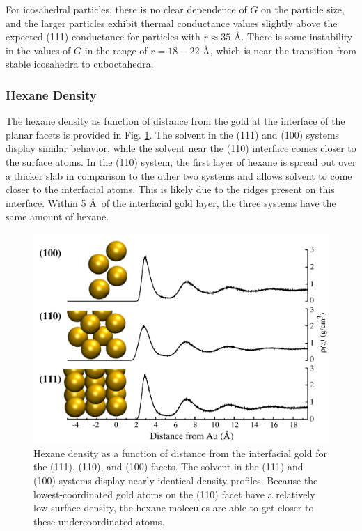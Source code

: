 For icosahedral particles, there is no clear dependence of $G$ on the
particle size, and the larger particles exhibit thermal conductance
values slightly above the expected (111) conductance for particles
with $r \approx 35$ \AA. There is some instability in the values of
$G$ in the range of $r = 18-22$ \AA, which is near the 
transition from stable icosahedra to
cuboctahedra.\cite{Myshlyavtsev2013}

\subsubsection{Hexane Density}
The hexane density as function of distance from the gold at the
interface of the planar facets is provided in Fig. \ref{fig:dens}. The
solvent in the (111) and (100) systems display similar behavior, while
the solvent near the (110) interface comes closer to the surface
atoms.  In the (110) system, the first layer of hexane is spread out
over a thicker slab in comparison to the other two systems and allows
solvent to come closer to the interfacial atoms.  This is likely due
to the ridges present on this interface.  Within 5 \AA\ of the
interfacial gold layer, the three systems have the same amount of
hexane.

\begin{figure}
        \includegraphics[width=\linewidth]{figures/stacked-hex-facets.pdf}
        \caption{Hexane density as a function of distance from the
          interfacial gold for the (111), (110), and (100) facets. The
          solvent in the (111) and (100) systems display nearly
          identical density profiles. Because the lowest-coordinated
          gold atoms on the (110) facet have a relatively low surface
          density, the hexane molecules are able to get closer to
          these undercoordinated atoms.}
        \label{fig:dens}
\end{figure}

